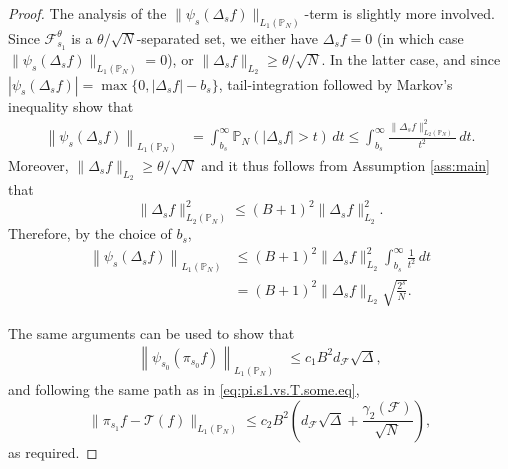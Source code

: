 \documentclass[10pt,a4paper]{amsart}
\renewcommand{\P}{\mathbb{P}}
\begin{document}
\begin{proof}
The analysis of the  $\|\psi_{s}(\Delta_{s} f)\|_{L_{1}(\P_N)}$-term is slightly more involved.
Since $\mathcal{F}_{s_{1}}^{\theta}$ is a $\theta/\sqrt{N}$-separated set, we either have $\Delta_{s} f=0$ (in which case  $\| \psi_{s}(\Delta_sf)\|_{L_{1}(\P_{N})} =0$), or $\|\Delta_{s } f\|_{L_{2}}\geq \theta/\sqrt N$.
In the latter case, and since $|\psi_{s}(\Delta_sf)| = \max\{0,|\Delta_sf|-b_{s}\}$,  tail-integration followed by Markov's inequality show that 
\begin{align*}
 \left\| \psi_{s}(\Delta_sf) \right\|_{L_{1}(\P_{N})}
& =\int_{b_{s}}^{\infty}\P_{N}(|\Delta_{s} f|> t) \,dt 
\leq \int_{b_{s}}^{\infty} \frac{ \|\Delta_{s} f \|_{L_2(\P_N)}^{2}}{ t^{2}} \,dt .
\end{align*}
Moreover, $\| \Delta_s f\|_{L_{2}}\geq\theta/\sqrt N$ and it thus follows from Assumption \ref{ass:main} that 
\[ \|\Delta_{s} f \|_{L_2(\P_N)}^{2} 
\leq  (B+1)^{2}  \|\Delta_{s} f \|_{L_2}^{2} .\]
Therefore, by the choice of $b_{s}$,
\begin{align*}
\left\| \psi_{s}(\Delta_sf) \right\|_{L_{1}(\P_{N})}
&\leq (B+1)^{2}  \|\Delta_{s} f \|_{L_2}^{2}  \int_{b_{s}}^{\infty} \frac{1}{t^{2}} \,dt \\
&=(B+1)^{2} \|\Delta_{s} f \|_{L_2} \sqrt{\frac{2^{s}}{N}}.
\end{align*}

The same arguments can be used to show that
\begin{align*}
 \left\| \psi_{s_{0}}(\pi_{s_{0}}f) \right\|_{L_{1}(\P_{N})}
&\leq c_{1}B^{2}  d_{\mathcal{F}}  \sqrt\Delta,
\end{align*}
and following the same path as in \eqref{eq:pi.s1.vs.T.some.eq}, 
\[\| \pi_{s_1}f-\mathcal{T}(f) \|_{L_{1}(\P_{N})} 
\leq c_{2} B^{2} \left(  d_{\mathcal{F}}  \sqrt\Delta  +  \frac{\gamma_{2}(\mathcal{F})}{\sqrt N} \right),\]
as required. 
\end{proof}
\end{document}
